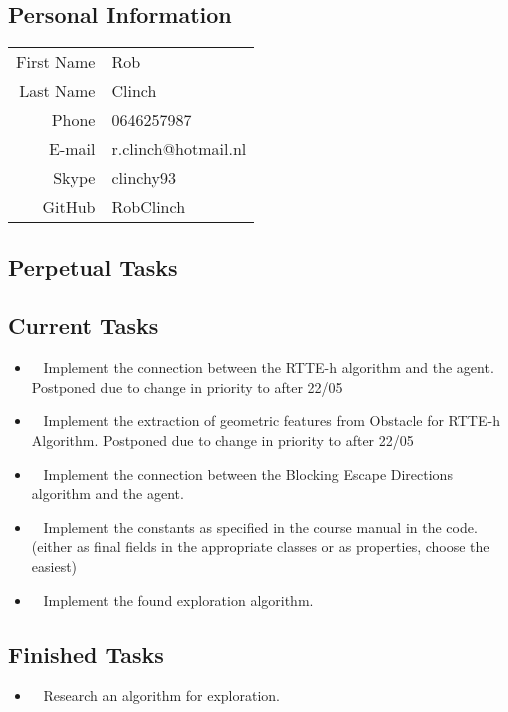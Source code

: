 \subsection{Personal Information}
\begin{table}[h!]
	\begin{tabular}{rl}
	First Name 	& Rob\\
	Last Name	& Clinch\\
	Phone		& 0646257987\\
	E-mail		& r.clinch@hotmail.nl\\
	Skype		& clinchy93\\
	GitHub		& RobClinch
\end{tabular}
\end{table}

\subsection{Perpetual Tasks}

\subsection{Current Tasks}
\begin{itemize}
	\item~
	Implement the connection between the RTTE-h algorithm and the agent.
		\subitem Postponed due to change in priority to after 22/05
	\item~
	Implement the extraction of geometric features from Obstacle for RTTE-h Algorithm.
		\subitem Postponed due to change in priority to after 22/05
	\item~
		Implement the connection between the Blocking Escape Directions algorithm and the agent.
	\item~
		Implement the constants as specified in the course manual in the code. (either as final fields in the appropriate classes or as properties, choose the easiest)
	\item~
		Implement the found exploration algorithm.
\end{itemize}

\subsection{Finished Tasks}
\begin{itemize}
\item~
		Research an algorithm for exploration.
\end{itemize}
